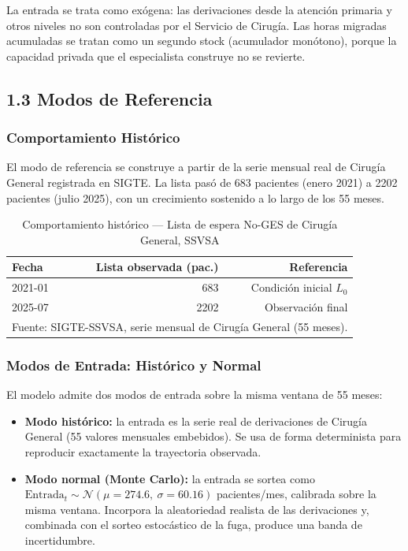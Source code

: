 \documentclass[12pt,a4paper]{article}
\begin{document}
La entrada se trata como exógena: las derivaciones desde la atención primaria y otros niveles no son controladas por el Servicio de Cirugía. Las horas migradas acumuladas se tratan como un segundo stock (acumulador monótono), porque la capacidad privada que el especialista construye no se revierte.

\subsection*{1.3 Modos de Referencia}

\subsubsection*{Comportamiento Histórico}

El modo de referencia se construye a partir de la serie mensual real de Cirugía General registrada en SIGTE. La lista pasó de 683 pacientes (enero 2021) a 2202 pacientes (julio 2025), con un crecimiento sostenido a lo largo de los 55 meses.

\begin{table}[H]
\centering
\caption{Comportamiento histórico — Lista de espera No-GES de Cirugía General, SSVSA}
\label{tab:historico}
\begin{tabular}{@{}lrr@{}}
\toprule
\rowcolor{azulDS!15}
\textbf{Fecha} & \textbf{Lista observada (pac.)} & \textbf{Referencia} \\
\midrule
2021-01 & 683  & Condición inicial $L_0$ \\
2025-07 & 2202 & Observación final \\
\bottomrule
\multicolumn{3}{l}{\footnotesize Fuente: SIGTE-SSVSA, serie mensual de Cirugía General (55 meses).}
\end{tabular}
\end{table}

\subsubsection*{Modos de Entrada: Histórico y Normal}

El modelo admite dos modos de entrada sobre la misma ventana de 55 meses:

\begin{itemize}[leftmargin=1.5cm]
  \item \textbf{Modo histórico:} la entrada es la serie real de derivaciones de Cirugía General (55 valores mensuales embebidos). Se usa de forma determinista para reproducir exactamente la trayectoria observada.
  \item \textbf{Modo normal (Monte Carlo):} la entrada se sortea como $\text{Entrada}_t \sim \mathcal{N}(\mu=274.6,\ \sigma=60.16)$ pacientes/mes, calibrada sobre la misma ventana. Incorpora la aleatoriedad realista de las derivaciones y, combinada con el sorteo estocástico de la fuga, produce una banda de incertidumbre.
\end{itemize}
\end{document}
